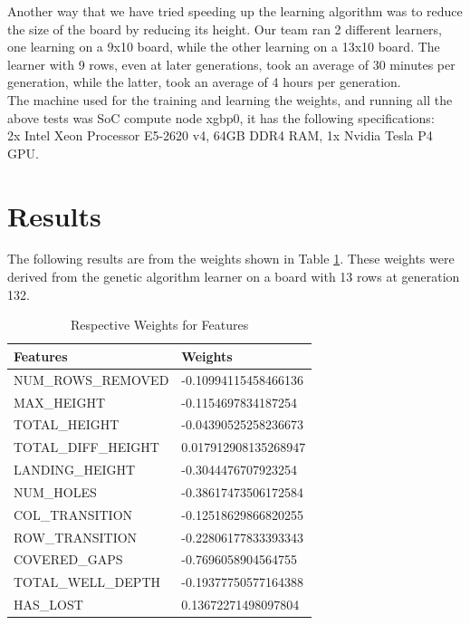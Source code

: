 \documentclass[a4paper,12pt,twocolumn]{article}
\begin{document}
Another way that we have tried speeding up the learning algorithm was to reduce
the size of the board by reducing its height. Our team ran 2 different learners,
one learning on a 9x10 board, while the other learning on a 13x10 board.
The learner with 9 rows, even at later generations, took an average of 30 minutes
per generation, while the latter, took an average of 4 hours per generation.\\

The machine used for the training and learning the weights, and running all the
above tests was SoC compute node xgbp0, it has the following specifications:\\

2x Intel Xeon Processor E5-2620 v4, 64GB DDR4 RAM, 1x Nvidia Tesla P4 GPU.

\section{Results}
The following results are from the weights shown in Table \ref{feature_weights}.
These weights were derived from the genetic algorithm learner on a board with 13 rows
at generation 132.\\

\begin{table}[h]
    \begin{tabular}{|l|l|}
        \hline
        \textbf{Features}   & \textbf{Weights}     \\
        \hline
        NUM\_ROWS\_REMOVED  & -0.10994115458466136 \\
        \hline
        MAX\_HEIGHT         & -0.1154697834187254  \\
        \hline
        TOTAL\_HEIGHT       & -0.04390525258236673 \\
        \hline
        TOTAL\_DIFF\_HEIGHT & 0.017912908135268947 \\
        \hline
        LANDING\_HEIGHT     & -0.3044476707923254  \\
        \hline
        NUM\_HOLES          & -0.38617473506172584 \\
        \hline
        COL\_TRANSITION     & -0.12518629866820255 \\
        \hline
        ROW\_TRANSITION     & -0.22806177833393343 \\
        \hline
        COVERED\_GAPS       & -0.7696058904564755  \\
        \hline
        TOTAL\_WELL\_DEPTH  & -0.19377750577164388 \\
        \hline
        HAS\_LOST           & 0.13672271498097804  \\
        \hline
    \end{tabular}
    \caption{Respective Weights for Features}
    \label{feature_weights}
\end{table}
\end{document}
